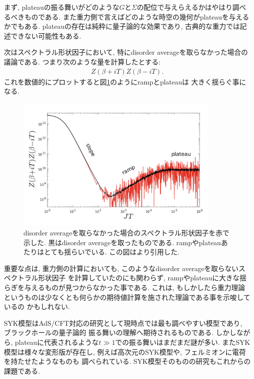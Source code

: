 まず, plateauの振る舞いがどのような$G$と$\Sigma$の配位で与えらえるかはやはり調べるべきものである. 
また重力側で言えばどのような時空の幾何がplateauを与えるかでもある. 
plateauの存在は純粋に量子論的な効果であり, 古典的な重力では記述できない可能性もある. 

次はスペクトラル形状因子において, 特にdisorder averageを取らなかった場合の議論である. 
つまり次のような量を計算したとする:
\begin{align}
	Z(\beta + iT)Z(\beta - iT).
\end{align}
これを数値的にプロットすると図\ref{fig:non_disorder_averaged_g}のようにrampとplateauは
大きく揺らぐ事になる. 
\begin{figure}[ht]
	\centering
	\includegraphics[width=10cm]{figures/non_disorder_averaged_g}
	\caption{disorder averageを取らなかった場合のスペクトラル形状因子を赤で示した. 
	黒はdisorder averageを取ったものである. 
	rampやplateauあたりはとても揺らいでいる. この図は\cite{stanford_chaos}より引用した. }
	\label{fig:non_disorder_averaged_g}
\end{figure}

重要な点は, 重力側の計算においても, このようなdisorder averageを取らないスペクトラル形状因子
を計算していたのにも関わらず, rampやplateauに大きな揺らぎを与えるものが見つからなかった事である. 
これは, もしかしたら重力理論というものは少なくとも何らかの期待値計算を施された理論である事を示唆しているの
かもしれない\cite{stanford_chaos}. 

SYK模型はAdS/CFT対応の研究として現時点では最も調べやすい模型であり, ブラックホールの量子論的
振る舞いの理解へ期待されるものである. 
しかしながら, plateauに代表されるような$t \gg 1$での振る舞いはまだまだ謎が多い. 
またSYK模型は様々な変形版が存在し, 例えば高次元のSYK模型や, フェルミオンに電荷を持たせたようなものも
調べられている\cite{gaikwad}\cite{berkooz}. 
SYK模型そのものの研究もこれからの課題である. 

\pagebreak

